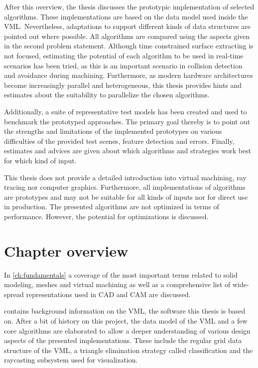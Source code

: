 After this overview, the thesis discusses the prototypic implementation of selected algorithms.
These implementations are based on the data model used inside the VML.
Nevertheless, adaptations to support different kinds of data structures are pointed out where possible.
All algorithms are compared using the aspects given in the second problem statement.
Although time constrained surface extracting is not focused, estimating the potential of each algorithm to be used in real-time scenarios has been tried, as this is an important scenario in collision detection and avoidance during machining. %
Furthermore, as modern hardware architectures become increasingly parallel and heterogeneous, this thesis provides hints and estimates about the suitability to parallelize the chosen algorithms.

Additionally, a suite of representative test models has been created and used to benchmark the prototyped approaches.
The primary goal thereby is to point out the strengths and limitations of the implemented prototypes on various difficulties of the provided test scenes, \eg feature detection and errors.
Finally, estimates and advices are given about which algorithms and strategies work best for which kind of input.

This thesis does not provide a detailed introduction into virtual machining, ray tracing nor computer graphics.
Furthermore, all implementations of algorithms are prototypes and may not be suitable for all kinds of inputs nor for direct use in production.
The presented algorithms are not optimized in terms of performance.
However, the potential for optimizations is discussed.


\section{Chapter overview}
\label{sec:chapter_overview}

In \cref{ch:fundamentals} a coverage of the most important terms related to solid modeling, meshes and virtual machining as well as a comprehensive list of wide-spread representations used in CAD and CAM are discussed.

 contains background information on the VML, the software this thesis is based on.
After a bit of history on this project, the data model of the VML and a few core algorithms are elaborated to allow a deeper understanding of various design aspects of the presented implementations. These include the regular grid data structure of the VML, a triangle elimination strategy called classification and the raycasting subsystem used for visualization.

